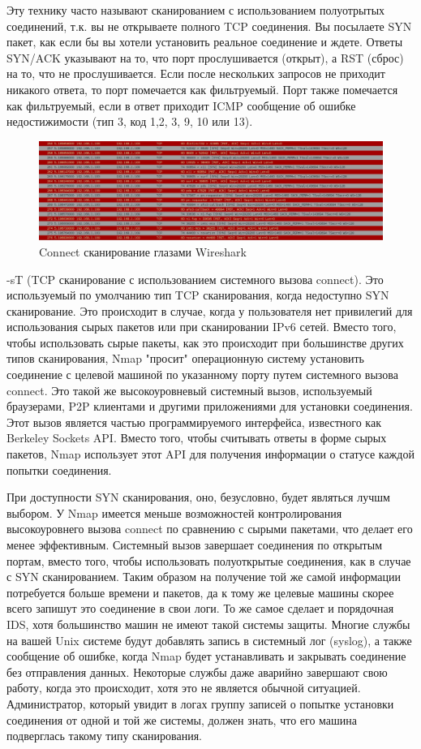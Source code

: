 \documentclass[10pt,a4paper]{article}
\begin{document}
Эту технику часто называют сканированием с использованием полуотрытых соединений, т.к. вы не открываете полного TCP соединения. Вы посылаете SYN пакет, как если бы вы хотели установить реальное соединение и ждете. Ответы SYN/ACK указывают на то, что порт прослушивается (открыт), а RST (сброс) на то, что не прослушивается. Если после нескольких запросов не приходит никакого ответа, то порт помечается как фильтруемый. Порт также помечается как фильтруемый, если в ответ приходит ICMP сообщение об ошибке недостижимости (тип 3, код 1,2, 3, 9, 10 или 13).

\begin{figure}[h!]
\centering
\includegraphics[scale=0.4]{wireshark_connect_scan.JPG}
\caption{Connect сканирование глазами Wireshark}
\end{figure}

-sT (TCP сканирование с использованием системного вызова connect).
Это используемый по умолчанию тип TCP сканирования, когда недоступно SYN сканирование. Это происходит в случае, когда у пользователя нет привилегий для использования сырых пакетов или при сканировании IPv6 сетей. Вместо того, чтобы использовать сырые пакеты, как это происходит при большинстве других типов сканирования, Nmap "просит" операционную систему установить соединение с целевой машиной по указанному порту путем системного вызова connect. Это такой же высокоуровневый системный вызов, используемый браузерами, P2P клиентами и другими приложениями для установки соединения. Этот вызов является частью программируемого интерфейса, известного как Berkeley Sockets API. Вместо того, чтобы считывать ответы в форме сырых пакетов, Nmap использует этот API для получения информации о статусе каждой попытки соединения.

При доступности SYN сканирования, оно, безусловно, будет являться лучшм выбором. У Nmap имеется меньше возможностей контролирования высокоуровнего вызова connect по сравнению с сырыми пакетами, что делает его менее эффективным. Системный вызов завершает соединения по открытым портам, вместо того, чтобы использовать полуоткрытые соединения, как в случае с SYN сканированием. Таким образом на получение той же самой информации потребуется больше времени и пакетов, да к тому же целевые машины скорее всего запишут это соединение в свои логи. То же самое сделает и порядочная IDS, хотя большинство машин не имеют такой системы защиты. Многие службы на вашей Unix системе будут добавлять запись в системный лог (syslog), а также сообщение об ошибке, когда Nmap будет устанавливать и закрывать соединение без отправления данных. Некоторые службы даже аварийно завершают свою работу, когда это происходит, хотя это не является обычной ситуацией. Администратор, который увидит в логах группу записей о попытке установки соединения от одной и той же системы, должен знать, что его машина подверглась такому типу сканирования.
\end{document}
